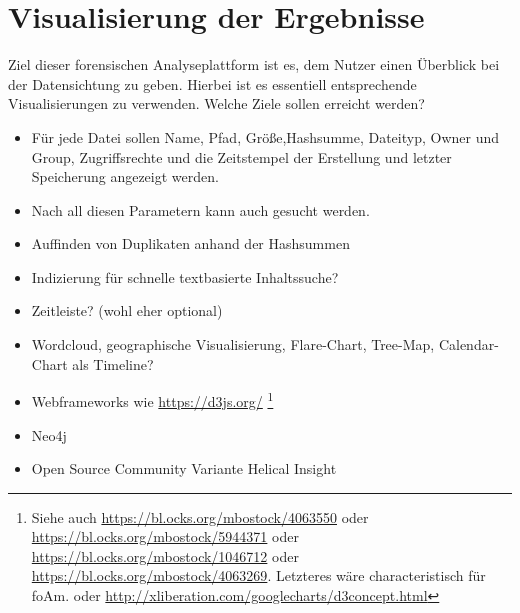 \section{Visualisierung der Ergebnisse}
Ziel dieser forensischen Analyseplattform ist es, dem Nutzer einen Überblick bei der Datensichtung zu geben. Hierbei ist es essentiell entsprechende Visualisierungen zu verwenden.
Welche Ziele sollen erreicht werden?
\begin{itemize}
\item Für jede Datei sollen Name, Pfad, Größe,Hashsumme, Dateityp, Owner und Group, Zugriffsrechte und die Zeitstempel der Erstellung und letzter Speicherung angezeigt werden. 
\item Nach all diesen Parametern kann auch gesucht werden.
\item Auffinden von Duplikaten anhand der Hashsummen
\item Indizierung für schnelle textbasierte Inhaltssuche?
\item Zeitleiste? (wohl eher optional)
\item Wordcloud, geographische Visualisierung, Flare-Chart, Tree-Map, Calendar-Chart als Timeline?
\item Webframeworks wie \url{https://d3js.org/} \footnote{Siehe auch \url{https://bl.ocks.org/mbostock/4063550} oder \url{https://bl.ocks.org/mbostock/5944371} oder \url{https://bl.ocks.org/mbostock/1046712} oder \url{https://bl.ocks.org/mbostock/4063269}. Letzteres wäre characteristisch für foAm. oder \url{http://xliberation.com/googlecharts/d3concept.html}}
\item Neo4j
\item Open Source Community Variante Helical Insight
\end{itemize}
